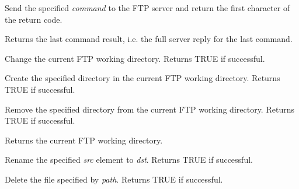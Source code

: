 \label{wxftpsendcommand}


Send the specified {\it command} to the FTP server and return the first
character of the return code.



Returns the last command result, i.e. the full server reply for the last
command.




Change the current FTP working directory.
Returns TRUE if successful.



Create the specified directory in the current FTP working directory.
Returns TRUE if successful.



Remove the specified directory from the current FTP working directory.
Returns TRUE if successful.



Returns the current FTP working directory.




Rename the specified {\it src} element to {\it dst}. Returns TRUE if successful.




Delete the file specified by {\it path}. Returns TRUE if successful.

